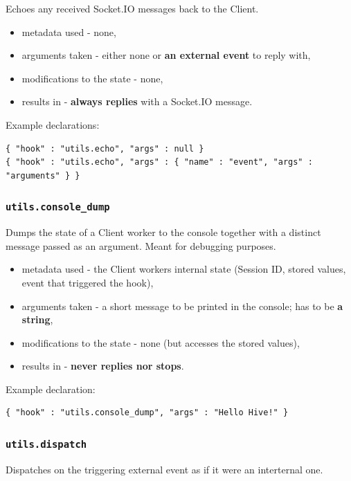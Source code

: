 \documentclass[a4paper]{article}
\begin{document}
Echoes any received Socket.IO messages back to the Client.


\begin{itemize}
\item metadata used - none,
\item arguments taken - either none or \textbf{an external event} to reply with,
\item modifications to the state - none,
\item results in - \textbf{always replies} with a Socket.IO message.
\end{itemize}

\noindent
Example declarations:

\begin{verbatim}
{ "hook" : "utils.echo", "args" : null }
{ "hook" : "utils.echo", "args" : { "name" : "event", "args" : "arguments" } }
\end{verbatim}
\subsubsection{\texttt{utils.console\_dump}}
\label{sec-9-2-2}

Dumps the state of a Client worker to the console together with a distinct message passed as an argument. Meant for debugging purposes.


\begin{itemize}
\item metadata used - the Client workers internal state (Session ID, stored values, event that triggered the hook),
\item arguments taken - a short message to be printed in the console; has to be \textbf{a string},
\item modifications to the state - none (but accesses the stored values),
\item results in - \textbf{never replies nor stops}.
\end{itemize}

\noindent
Example declaration:

\begin{verbatim}
{ "hook" : "utils.console_dump", "args" : "Hello Hive!" }
\end{verbatim}
\subsubsection{\texttt{utils.dispatch}}
\label{sec-9-2-3}

Dispatches on the triggering external event as if it were an interternal one.
\end{document}
